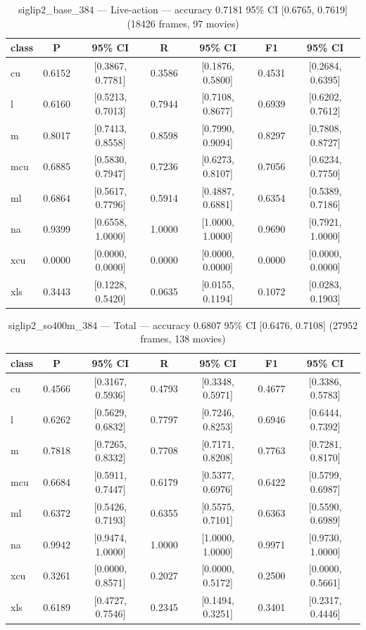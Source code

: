 \begin{table}[htbp]
\centering
\caption{siglip2\_base\_384 — Live-action — accuracy 0.7181 95\% CI [0.6765, 0.7619] (18426 frames, 97 movies)}
\label{tab:siglip2-base-384-live-action}
\begin{tabular}{lcccccc}
\toprule
class & P & 95\% CI & R & 95\% CI & F1 & 95\% CI \\
\midrule
cu & 0.6152 & [0.3867, 0.7781] & 0.3586 & [0.1876, 0.5800] & 0.4531 & [0.2684, 0.6395] \\
l & 0.6160 & [0.5213, 0.7013] & 0.7944 & [0.7108, 0.8677] & 0.6939 & [0.6202, 0.7612] \\
m & 0.8017 & [0.7413, 0.8558] & 0.8598 & [0.7990, 0.9094] & 0.8297 & [0.7808, 0.8727] \\
mcu & 0.6885 & [0.5830, 0.7947] & 0.7236 & [0.6273, 0.8107] & 0.7056 & [0.6234, 0.7750] \\
ml & 0.6864 & [0.5617, 0.7796] & 0.5914 & [0.4887, 0.6881] & 0.6354 & [0.5389, 0.7186] \\
na & 0.9399 & [0.6558, 1.0000] & 1.0000 & [1.0000, 1.0000] & 0.9690 & [0.7921, 1.0000] \\
xcu & 0.0000 & [0.0000, 0.0000] & 0.0000 & [0.0000, 0.0000] & 0.0000 & [0.0000, 0.0000] \\
xls & 0.3443 & [0.1228, 0.5420] & 0.0635 & [0.0155, 0.1194] & 0.1072 & [0.0283, 0.1903] \\
\bottomrule
\end{tabular}
\end{table}

\begin{table}[htbp]
\centering
\caption{siglip2\_so400m\_384 — Total — accuracy 0.6807 95\% CI [0.6476, 0.7108] (27952 frames, 138 movies)}
\label{tab:siglip2-so400m-384-total}
\begin{tabular}{lcccccc}
\toprule
class & P & 95\% CI & R & 95\% CI & F1 & 95\% CI \\
\midrule
cu & 0.4566 & [0.3167, 0.5936] & 0.4793 & [0.3348, 0.5971] & 0.4677 & [0.3386, 0.5783] \\
l & 0.6262 & [0.5629, 0.6832] & 0.7797 & [0.7246, 0.8253] & 0.6946 & [0.6444, 0.7392] \\
m & 0.7818 & [0.7265, 0.8332] & 0.7708 & [0.7171, 0.8208] & 0.7763 & [0.7281, 0.8170] \\
mcu & 0.6684 & [0.5911, 0.7447] & 0.6179 & [0.5377, 0.6976] & 0.6422 & [0.5799, 0.6987] \\
ml & 0.6372 & [0.5426, 0.7193] & 0.6355 & [0.5575, 0.7101] & 0.6363 & [0.5590, 0.6989] \\
na & 0.9942 & [0.9474, 1.0000] & 1.0000 & [1.0000, 1.0000] & 0.9971 & [0.9730, 1.0000] \\
xcu & 0.3261 & [0.0000, 0.8571] & 0.2027 & [0.0000, 0.5172] & 0.2500 & [0.0000, 0.5661] \\
xls & 0.6189 & [0.4727, 0.7546] & 0.2345 & [0.1494, 0.3251] & 0.3401 & [0.2317, 0.4446] \\
\bottomrule
\end{tabular}
\end{table}

